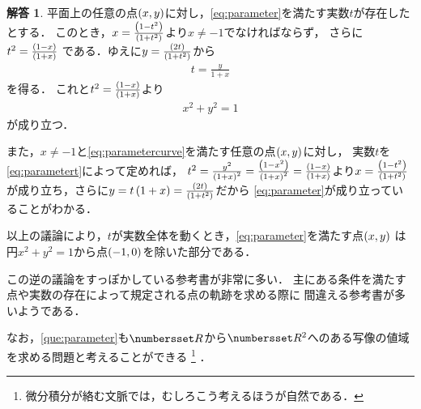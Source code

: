 \documentclass[11pt,a4paper]{ltjsarticle}
\newcommand*{\coord}[1]{\paren{#1}}
\theoremstyle{definition}
\newtheorem{ans}[dfn]{解答}
\begin{document}
\begin{ans} \label{ans:parameter}
	平面上の任意の点$\coord{x, y}$に対し，\cref{eq:parameter}を満たす実数$t$が存在したとする．
	このとき，$x = \frac{\paren*{1 - t^2}}{\paren*{1 + t^2}}$より$x \neq -1$でなければならず，
	さらに$t^2 = \frac{\paren*{1 - x}}{\paren*{1 + x}}$
	である．ゆえに$y = \frac{\paren*{2t}}{\paren*{1 + t^2}}$から
	\begin{align}
		t = \frac{y}{1 + x}
		\label{eq:parametert}
	\end{align}
	を得る．
	これと$t^2 = \frac{\paren*{1 - x}}{\paren*{1 + x}}$より
	\begin{align}
		x^2 + y^2 = 1
		\label{eq:parametercurve}
	\end{align}
	が成り立つ．

	また，$x \neq -1$と\cref{eq:parametercurve}を満たす任意の点$\coord{x, y}$に対し，
	実数$t$を\cref{eq:parametert}によって定めれば，
	$t^2 = \frac{y^2}{\paren*{1 + x}^2} = \frac{\paren*{1 - x^2}}{\paren*{1 + x}^2}
		= \frac{\paren*{1 - x}}{\paren*{1 + x}}$より$x = \frac{\paren*{1 - t^2}}{\paren*{1 + t^2}}$
	が成り立ち，さらに$y = t \paren{1 + x} = \frac{\paren*{2t}}{\paren*{1 + t^2}}$だから
	\cref{eq:parameter}が成り立っていることがわかる．

	以上の議論により，$t$が実数全体を動くとき，\cref{eq:parameter}を満たす点$\coord{x,y}$
	は円$x^2 + y^2 = 1$から点$\coord{-1, 0}$を除いた部分である．
\end{ans}

この逆の議論をすっぽかしている参考書が非常に多い．
主にある条件を満たす点や実数の存在によって規定される点の軌跡を求める際に
間違える参考書が多いようである．

なお，\cref{que:parameter}も$\Real$から$\Real^2$へのある写像の値域を求める問題と考えることができる%
\footnote{微分積分が絡む文脈では，むしろこう考えるほうが自然である．}%
．
\end{document}
